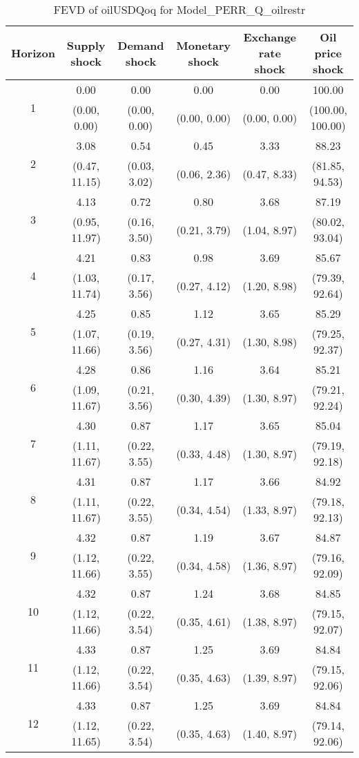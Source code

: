 \documentclass{article}
\begin{document}
\begin{table}
	\footnotesize
	\caption{FEVD of oilUSDQoq for Model_PERR_Q_oilrestr}
	\begin{tabular}{cccccc}
		Horizon & Supply shock & Demand shock & Monetary shock & Exchange rate shock & Oil price shock\\ \hline
		\multirow{2}{*}{1} & 0.00 & 0.00 & 0.00 & 0.00 & 100.00\\
		 & (0.00, 0.00) & (0.00, 0.00) & (0.00, 0.00) & (0.00, 0.00) & (100.00, 100.00)\\
		\multirow{2}{*}{2} & 3.08 & 0.54 & 0.45 & 3.33 & 88.23\\
		 & (0.47, 11.15) & (0.03, 3.02) & (0.06, 2.36) & (0.47, 8.33) & (81.85, 94.53)\\
		\multirow{2}{*}{3} & 4.13 & 0.72 & 0.80 & 3.68 & 87.19\\
		 & (0.95, 11.97) & (0.16, 3.50) & (0.21, 3.79) & (1.04, 8.97) & (80.02, 93.04)\\
		\multirow{2}{*}{4} & 4.21 & 0.83 & 0.98 & 3.69 & 85.67\\
		 & (1.03, 11.74) & (0.17, 3.56) & (0.27, 4.12) & (1.20, 8.98) & (79.39, 92.64)\\
		\multirow{2}{*}{5} & 4.25 & 0.85 & 1.12 & 3.65 & 85.29\\
		 & (1.07, 11.66) & (0.19, 3.56) & (0.27, 4.31) & (1.30, 8.98) & (79.25, 92.37)\\
		\multirow{2}{*}{6} & 4.28 & 0.86 & 1.16 & 3.64 & 85.21\\
		 & (1.09, 11.67) & (0.21, 3.56) & (0.30, 4.39) & (1.30, 8.97) & (79.21, 92.24)\\
		\multirow{2}{*}{7} & 4.30 & 0.87 & 1.17 & 3.65 & 85.04\\
		 & (1.11, 11.67) & (0.22, 3.55) & (0.33, 4.48) & (1.30, 8.97) & (79.19, 92.18)\\
		\multirow{2}{*}{8} & 4.31 & 0.87 & 1.17 & 3.66 & 84.92\\
		 & (1.11, 11.67) & (0.22, 3.55) & (0.34, 4.54) & (1.33, 8.97) & (79.18, 92.13)\\
		\multirow{2}{*}{9} & 4.32 & 0.87 & 1.19 & 3.67 & 84.87\\
		 & (1.12, 11.66) & (0.22, 3.55) & (0.34, 4.58) & (1.36, 8.97) & (79.16, 92.09)\\
		\multirow{2}{*}{10} & 4.32 & 0.87 & 1.24 & 3.68 & 84.85\\
		 & (1.12, 11.66) & (0.22, 3.54) & (0.35, 4.61) & (1.38, 8.97) & (79.15, 92.07)\\
		\multirow{2}{*}{11} & 4.33 & 0.87 & 1.25 & 3.69 & 84.84\\
		 & (1.12, 11.66) & (0.22, 3.54) & (0.35, 4.63) & (1.39, 8.97) & (79.15, 92.06)\\
		\multirow{2}{*}{12} & 4.33 & 0.87 & 1.25 & 3.69 & 84.84\\
		 & (1.12, 11.65) & (0.22, 3.54) & (0.35, 4.63) & (1.40, 8.97) & (79.14, 92.06)\\
	\end{tabular}
\label{tab:fevd-Model_PERR_Q_oilrestr-oilUSDQoq}
\end{table}
\end{document}
